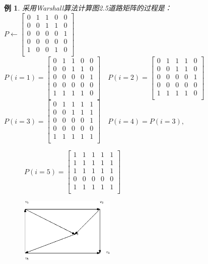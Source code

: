 \documentclass[11pt,a4paper,openany]{book}
\newtheorem{sample}{\textbf{例}}[section]
\begin{document}
\begin{sample}\K
采用Warshall算法计算图2.5道路矩阵的过程是：\\
$P\leftarrow
\begin{bmatrix}
0&1&1&0&0\\
0&0&1&1&0\\
0&0&0&0&1\\
0&0&0&0&0\\
1&0&0&1&0\\
\end{bmatrix}
$\\
$P(i=1)=\begin{bmatrix}
0&1&1&0&0\\
0&0&1&1&0\\
0&0&0&0&1\\
0&0&0&0&0\\
1&1&1&1&0\\
\end{bmatrix}\quad P(i=2)= \begin{bmatrix}
0&1&1&1&0\\
0&0&1&1&0\\
0&0&0&0&1\\
0&0&0&0&0\\
1&1&1&1&0\\
\end{bmatrix}
$\\
$P(i=3)=\begin{bmatrix}
0&1&1&1&1\\
0&0&1&1&1\\
0&0&0&0&1\\
0&0&0&0&0\\
1&1&1&1&1\\
\end{bmatrix}\quad P(i=4)=P(i=3),
$\\
\begin{figure}[h]
\vspace{-50pt}
\parbox[t]{0.5\textwidth}{$
P(i=5)=\begin{bmatrix}
1&1&1&1&1\\
1&1&1&1&1\\
1&1&1&1&1\\
0&0&0&0&0\\
1&1&1&1&1\\
\end{bmatrix}$}
\centering
\includegraphics[width=0.4\textwidth]{2_5.eps}%
\captionsetup{margin=3em}
\caption{}
\vspace{-30pt}
\end{figure}
\end{sample}
\end{document}
